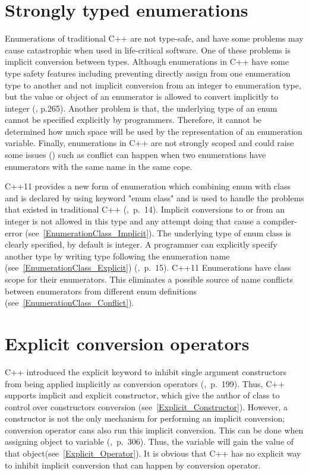 \documentclass[11pt]{report}
\begin{document}
\section{Strongly typed enumerations}
\label{section: Strongly typed enumerations}
Enumerations of traditional C++ are not type-safe, and have some problems may cause catastrophic when used in life-critical software. One of these problems is implicit conversion between types. Although enumerations in C++ have some type safety features including preventing directly assign from one enumeration type to another and not implicit conversion from an integer to enumeration type, but the value or object of an enumerator is allowed to convert implicitly to integer (\cite{Overland:2011:CWF}, p.265). Another problem is that, the underlying type of an enum cannot be specified explicitly by programmers. Therefore, it cannot be determined how much space will be used by the representation of an enumeration variable. Finally, enumerations in C++ are not strongly scoped and could raise some issues (\cite{Stroustrup:2012:Cpp11}) such as conflict can happen when two enumerations have enumerators with the same name in the same cope.

C++11 provides a new form of enumeration which combining enum with class and is declared by using keyword "enum class" and is used to handle the problems that existed in traditional C++ (\cite{Gregorie:professionalcpp},~p.~14).  Implicit conversions to or from an integer is not allowed in this type and any attempt doing that cause a compiler-error (see~\ref{EnumerationClass_Implicit}). The underlying type of enum class is clearly specified, by default is integer. A programmer can explicitly specify another type by writing type following the enumeration name (see~\ref{EnumerationClass_Explicit}) (\cite{Gregorie:professionalcpp},~p.~15). C++11 Enumerations have class scope for their enumerators. This eliminates a possible source of name conflicts between enumerators from different enum definitions (see~\ref{EnumerationClass_Conflict}).

\section{Explicit conversion operators}
\label{section: Explicit Conversion Operators}
C++ introduced the explicit keyword to inhibit single argument constructors from being applied implicitly as conversion operators (\cite{Gregorie:professionalcpp},~p.~199). Thus, C++ supports implicit and explicit constructor, which give the author of class to control over constructors conversion (see~\ref{Explicit_Constructor}). However, a constructor is not the only mechanism for performing an implicit conversion; conversion operator cans also run this implicit conversion. This can be done when assigning object to variable (\cite{Gregorie:professionalcpp},~p.~306). Thus, the variable will gain the value of that object(see~\ref{Explicit_Operator}). It is obvious that C++ has no explicit way to inhibit implicit conversion that can happen by conversion operator.
\end{document}
